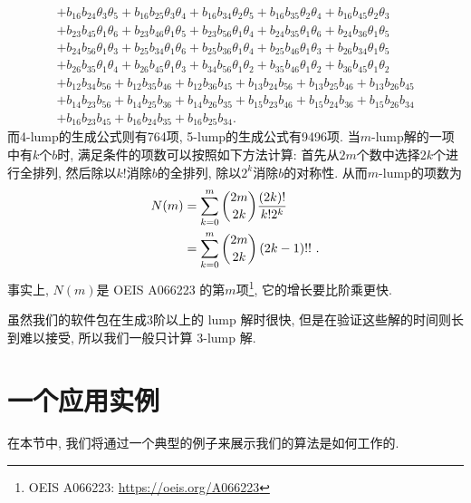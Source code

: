 \begin{equation}
\begin{array}{l}
+b_{{16}}b_{{24}}\theta_{{3}}\theta_{{5}}
+b_{{16}}b_{{25}}\theta_{{3}}\theta_{{4}}
+b_{{16}}b_{{34}}\theta_{{2}}\theta_{{5}}
+b_{{16}}b_{{35}}\theta_{{2}}\theta_{{4}}
+b_{{16}}b_{{45}}\theta_{{2}}\theta_{{3}}\\
+b_{{23}}b_{{45}}\theta_{{1}}\theta_{{6}}
+b_{{23}}b_{{46}}\theta_{{1}}\theta_{{5}}
+b_{{23}}b_{{56}}\theta_{{1}}\theta_{{4}}
+b_{{24}}b_{{35}}\theta_{{1}}\theta_{{6}}
+b_{{24}}b_{{36}}\theta_{{1}}\theta_{{5}}\\
+b_{{24}}b_{{56}}\theta_{{1}}\theta_{{3}}
+b_{{25}}b_{{34}}\theta_{{1}}\theta_{{6}}
+b_{{25}}b_{{36}}\theta_{{1}}\theta_{{4}}
+b_{{25}}b_{{46}}\theta_{{1}}\theta_{{3}}
+b_{{26}}b_{{34}}\theta_{{1}}\theta_{{5}}\\
+b_{{26}}b_{{35}}\theta_{{1}}\theta_{{4}}
+b_{{26}}b_{{45}}\theta_{{1}}\theta_{{3}}
+b_{{34}}b_{{56}}\theta_{{1}}\theta_{{2}}
+b_{{35}}b_{{46}}\theta_{{1}}\theta_{{2}}
+b_{{36}}b_{{45}}\theta_{{1}}\theta_{{2}}\\
+b_{{12}}b_{{34}}b_{{56}}
+b_{{12}}b_{{35}}b_{{46}}
+b_{{12}}b_{{36}}b_{{45}}
+b_{{13}}b_{{24}}b_{{56}}
+b_{{13}}b_{{25}}b_{{46}}
+b_{{13}}b_{{26}}b_{{45}}\\
+b_{{14}}b_{{23}}b_{{56}}
+b_{{14}}b_{{25}}b_{{36}}
+b_{{14}}b_{{26}}b_{{35}}
+b_{{15}}b_{{23}}b_{{46}}
+b_{{15}}b_{{24}}b_{{36}}
+b_{{15}}b_{{26}}b_{{34}}\\
+b_{{16}}b_{{23}}b_{{45}}
+b_{{16}}b_{{24}}b_{{35}}
+b_{{16}}b_{{25}}b_{{34}} .
\end{array}
\end{equation}
而4-lump的生成公式则有764项, 5-lump的生成公式有9496项. 当$m$-lump解的一项中有$k$个$b$时, 满足条件的项数可以按照如下方法计算: 首先从$2m$个数中选择$2k$个进行全排列, 然后除以$k!$消除$b$的全排列, 除以$2^k$消除$b$的对称性. 从而$m$-lump的项数为
\begin{equation}
\begin{split}
N(m)&=\sum_{k=0}^{m}{\binom{2m}{2k}\frac{(2k)!}{k!2^k}} \\ 
&=\sum_{k=0}^m{\binom{2m}{2k}\left(2k-1\right)!!} ~.
\end{split}
\end{equation}
事实上, $N(m)$是 OEIS A066223 的第$m$项\footnote{OEIS A066223: \url{https://oeis.org/A066223}}, 它的增长要比阶乘更快. 

虽然我们的软件包在生成3阶以上的 lump 解时很快, 但是在验证这些解的时间则长到难以接受, 所以我们一般只计算 3-lump 解.

\section{一个应用实例}
在本节中, 我们将通过一个典型的例子来展示我们的算法是如何工作的.

